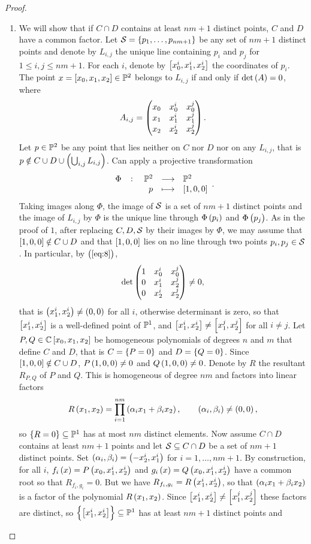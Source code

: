 \begin{proof}
\begin{enumerate}

\item We will show that if $ C \cap D $ contains at least $ nm + 1 $ distinct points, $ C $ and $ D $ have a common factor. Let $ \SS = \cbr{p_1, \dots, p_{nm + 1}} $ be any set of $ nm + 1 $ distinct points and denote by $ L_{i, j} $ the unique line containing $ p_i $ and $ p_j $ for $ 1 \le i, j \le nm + 1 $. For each $ i $, denote by $ \sbr{x_0^i, x_1^i, x_2^i} $ the coordinates of $ p_i $. The point $ x = \sbr{x_0, x_1, x_2} \in \P^2 $ belongs to $ L_{i, j} $ if and only if $ \det\br{A} = 0 $, where
\begin{equation}
\label{eq:8}
A_{i, j} = \threebythree{x_0}{x_0^i}{x_0^j}{x_1}{x_1^i}{x_1^j}{x_2}{x_2^i}{x_2^j}.
\end{equation}
Let $ p \in \P^2 $ be any point that lies neither on $ C $ nor $ D $ nor on any $ L_{i, j} $, that is $ p \notin C \cup D \cup \br{\bigcup_{i, j} L_{i, j}} $. Can apply a projective transformation
$$ \function[\Phi]{\P^2}{\P^2}{p}{\sbr{1, 0, 0}}. $$
Taking images along $ \Phi $, the image of $ \SS $ is a set of $ nm + 1 $ distinct points and the image of $ L_{i, j} $ by $ \Phi $ is the unique line through $ \Phi\br{p_i} $ and $ \Phi\br{p_j} $. As in the proof of $ 1 $, after replacing $ C, D, \SS $ by their images by $ \Phi $, we may assume that $ \sbr{1, 0, 0} \notin C \cup D $ and that $ \sbr{1, 0, 0} $ lies on no line through two points $ p_i, p_j \in \SS $. In particular, by $ \br{\ref{eq:8}} $,
$$ \det\threebythree{1}{x_0^i}{x_0^j}{0}{x_1^i}{x_2^j}{0}{x_2^i}{x_2^j} \ne 0, $$
that is $ \br{x_1^i, x_2^i} \ne \br{0, 0} $ for all $ i $, otherwise determinant is zero, so that $ \sbr{x_1^i, x_2^i} $ is a well-defined point of $ \P^1 $, and $ \sbr{x_1^i, x_2^i} \ne \sbr{x_1^j, x_2^j} $ for all $ i \ne j $. Let $ P, Q \in \C\sbr{x_0, x_1, x_2} $ be homogeneous polynomials of degrees $ n $ and $ m $ that define $ C $ and $ D $, that is $ C = \cbr{P = 0} $ and $ D = \cbr{Q = 0} $. Since $ \sbr{1, 0, 0} \notin C \cup D $, $ P\br{1, 0, 0} \ne 0 $ and $ Q\br{1, 0, 0} \ne 0 $. Denote by $ R $ the resultant $ R_{P, Q} $ of $ P $ and $ Q $. This is homogeneous of degree $ nm $ and factors into linear factors
$$ R\br{x_1, x_2} = \prod_{i = 1}^{nm}\br{\alpha_ix_1 + \beta_ix_2}, \qquad \br{\alpha_i, \beta_i} \ne \br{0, 0}, $$
so $ \cbr{R = 0} \subseteq \P^1 $ has at most $ nm $ distinct elements. Now assume $ C \cap D $ contains at least $ nm + 1 $ points and let $ \SS \subseteq C \cap D $ be a set of $ nm + 1 $ distinct points. Set $ \br{\alpha_i, \beta_i} = \br{-x_2^i, x_1^i} $ for $ i = 1, \dots, nm + 1 $. By construction, for all $ i $, $ f_i\br{x} = P\br{x_0, x_1^i, x_2^i} $ and $ g_i\br{x} = Q\br{x_0, x_1^i, x_2^i} $ have a common root so that $ R_{f_i, g_i} = 0 $. But we have $ R_{f_i, g_i} = R\br{x_1^i, x_2^i} $, so that $ \br{\alpha_ix_1 + \beta_ix_2} $ is a factor of the polynomial $ R\br{x_1, x_2} $. Since $ \sbr{x_1^i, x_2^i} \ne \sbr{x_1^j, x_2^j} $ these factors are distinct, so $ \cbr{\sbr{x_1^i, x_2^i}} \subseteq \P^1 $ has at least $ nm + 1 $ distinct points and

\end{enumerate}
\end{proof}
